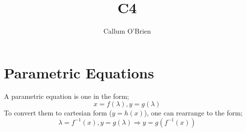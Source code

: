 \documentclass{article}
\title{C4}
\author{Callum O'Brien}
\begin{document}
\maketitle
\tableofcontents

\section{Parametric Equations}

A parametric equation is one in the form;
\[x=f(\lambda),y=g(\lambda)\]
\noindent To convert them to cartesian form ($y=h(x)$), one can rearrange to the form;
\[\lambda=f^{-1}(x),y=g(\lambda)\Rightarrow y=g(f^{-1}(x))\]
\end{document}
